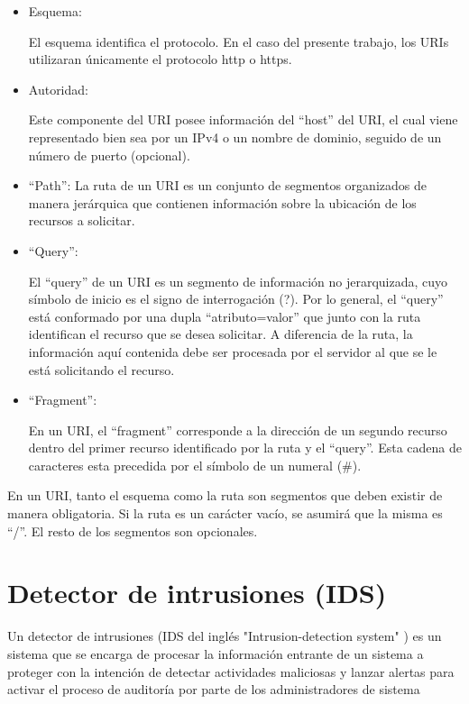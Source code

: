 \begin{itemize}

\item Esquema:

El esquema identifica el protocolo. En el caso del presente trabajo, los URIs utilizaran únicamente el protocolo http o https.


\item Autoridad:

Este componente del URI posee información del ``host'' del URI, el cual viene representado bien sea por un IPv4 o un nombre de dominio, seguido de un número de puerto (opcional).
   
\item ``Path'':
La ruta de un URI es un conjunto de segmentos organizados de manera jerárquica que contienen información sobre la ubicación de los recursos a solicitar.

\item ``Query'':

El ``query'' de un URI es un segmento de información no jerarquizada, cuyo símbolo de inicio es el signo de interrogación (?). Por lo general, el ``query'' está conformado por una dupla ``atributo=valor'' que junto con la ruta identifican el recurso que se desea solicitar. A diferencia de la ruta, la información aquí contenida debe ser procesada por el servidor al que se le está solicitando el recurso. 

\item ``Fragment'':

En un URI, el ``fragment'' corresponde a la dirección de un segundo recurso dentro del primer recurso identificado por la ruta y el ``query''. Esta cadena de caracteres esta precedida por el símbolo de un numeral (\#).

\end{itemize}

En un URI, tanto el esquema como la ruta son segmentos que deben existir de manera obligatoria. Si la ruta es un carácter vac\'io, se asumir\'a que la misma es ``/''. El resto de los segmentos son opcionales.

\section{Detector de intrusiones (IDS)}
Un detector de intrusiones (IDS del inglés "Intrusion-detection system" ) es un sistema que se encarga de procesar la información entrante de un sistema a proteger con la intención de detectar actividades maliciosas y lanzar alertas para activar el proceso de auditoría por parte de los administradores de sistema \cite{IDS}

